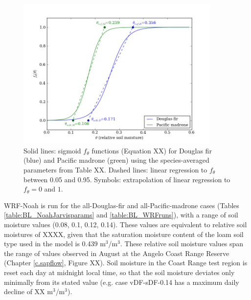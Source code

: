 \begin{figure}[here]
\includegraphics[width=0.9\textwidth]{ch2-BL/figures/theta_params.png}
\caption{Solid lines: sigmoid $f_{\theta}$ functions (Equation XX) for Douglas fir (blue) and Pacific madrone (green) using the species-averaged parameters from Table XX.  Dashed lines: linear regression to $f_{\theta}$ between 0.05 and 0.95.  Symbols: extrapolation of linear regression to $f_{\theta}=0$ and $1$.}
\label{fig:BL_FeddesParams}
\end{figure}


WRF-Noah is run for the all-Douglas-fir and all-Pacific-madrone cases (Tables \ref{table:BL_NoahJarvisparams} and \ref{table:BL_WRFruns}), with a range of soil moisture values (0.08, 0.1, 0.12, 0.14).  These values are equivalent to relative soil moistures of XXXX, given that the saturation moisture content of the loam soil type used in the model is 0.439 m$^3$/m$^3$.  These relative soil moisture values span the range of values observed in August at the Angelo Coast Range Reserve (Chapter \ref{c.sapflow}, Figure XX).  Soil moisture in the Coast Range test region is reset each day at midnight local time, so that the soil moisture deviates only minimally from its stated value (e.g. case vDF-sDF-0.14 has a maximum daily decline of XX m$^3$/m$^3$).
